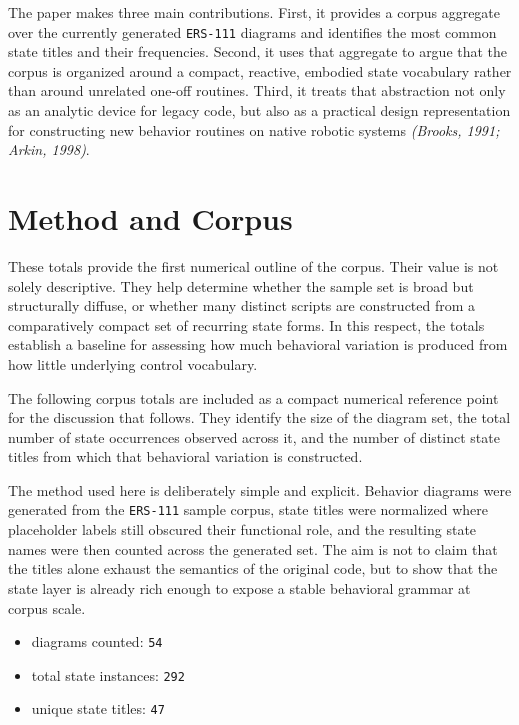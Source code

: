\documentclass[11pt]{article}
\begin{document}
The paper makes three main contributions. First, it provides a corpus
aggregate over the currently generated \texttt{ERS-111} diagrams and
identifies the most common state titles and their frequencies. Second,
it uses that aggregate to argue that the corpus is organized around a
compact, reactive, embodied state vocabulary rather than around
unrelated one-off routines. Third, it treats that abstraction not only
as an analytic device for legacy code, but also as a practical design
representation for constructing new behavior routines on native robotic
systems \textit{(Brooks, 1991; Arkin, 1998)}.

\section*{Method and Corpus}

These totals provide the first numerical outline of the corpus. Their
value is not solely descriptive. They help determine whether the sample
set is broad but structurally diffuse, or whether many distinct scripts
are constructed from a comparatively compact set of recurring state
forms. In this respect, the totals establish a baseline for assessing
how much behavioral variation is produced from how little underlying
control vocabulary.

The following corpus totals are included as a compact numerical
reference point for the discussion that follows. They identify the size
of the diagram set, the total number of state occurrences observed
across it, and the number of distinct state titles from which that
behavioral variation is constructed.

The method used here is deliberately simple and explicit. Behavior
diagrams were generated from the \texttt{ERS-111} sample corpus, state
titles were normalized where placeholder labels still obscured their
functional role, and the resulting state names were then counted
across the generated set. The aim is not to claim that the titles
alone exhaust the semantics of the original code, but to show that the
state layer is already rich enough to expose a stable behavioral
grammar at corpus scale.

\begin{itemize}
\item diagrams counted: \texttt{54}
\item total state instances: \texttt{292}
\item unique state titles: \texttt{47}
\end{itemize}
\end{document}

